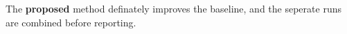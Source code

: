 The \textbf{proposed} method definately improves the baseline, and the seperate runs are combined before reporting.
